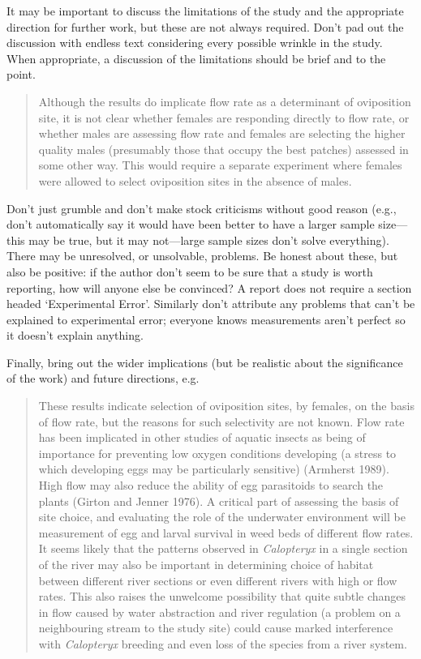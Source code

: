 \documentclass[
]{book}
\begin{document}
It may be important to discuss the limitations of the study and the appropriate direction for further work, but these are not always required. Don't pad out the discussion with endless text considering every possible wrinkle in the study. When appropriate, a discussion of the limitations should be brief and to the point.

\begin{quote}
Although the results do implicate flow rate as a determinant of oviposition site, it is not clear whether females are responding directly to flow rate, or whether males are assessing flow rate and females are selecting the higher quality males (presumably those that occupy the best patches) assessed in some other way. This would require a separate experiment where females were allowed to select oviposition sites in the absence of males.
\end{quote}

Don't just grumble and don't make stock criticisms without good reason (e.g., don't automatically say it would have been better to have a larger sample size---this may be true, but it may not---large sample sizes don't solve everything). There may be unresolved, or unsolvable, problems. Be honest about these, but also be positive: if the author don't seem to be sure that a study is worth reporting, how will anyone else be convinced? A report does not require a section headed `Experimental Error'. Similarly don't attribute any problems that can't be explained to experimental error; everyone knows measurements aren't perfect so it doesn't explain anything.

Finally, bring out the wider implications (but be realistic about the significance of the work) and future directions, e.g.

\begin{quote}
These results indicate selection of oviposition sites, by females, on the basis of flow rate, but the reasons for such selectivity are not known. Flow rate has been implicated in other studies of aquatic insects as being of importance for preventing low oxygen conditions developing (a stress to which developing eggs may be particularly sensitive) (Armherst 1989). High flow may also reduce the ability of egg parasitoids to search the plants (Girton and Jenner 1976). A critical part of assessing the basis of site choice, and evaluating the role of the underwater environment will be measurement of egg and larval survival in weed beds of different flow rates. It seems likely that the patterns observed in \emph{Calopteryx} in a single section of the river may also be important in determining choice of habitat between different river sections or even different rivers with high or flow rates. This also raises the unwelcome possibility that quite subtle changes in flow caused by water abstraction and river regulation (a problem on a neighbouring stream to the study site) could cause marked interference with \emph{Calopteryx} breeding and even loss of the species from a river system.
\end{quote}
\end{document}
